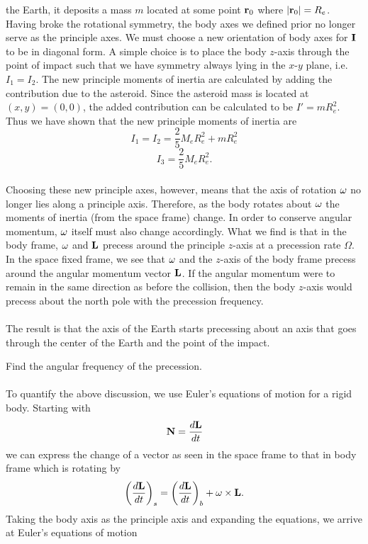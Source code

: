 \documentclass[11pt,letterpaper]{article}
\begin{document}
			the Earth, it deposits a mass $m$ located at some point $\mathbf{r}_0$ where $|\mathbf{r}_0| = R_e$. Having broke the rotational 
			symmetry, the body axes we defined prior no longer serve as the principle axes. We must choose a new orientation of body 
			axes for $\mathbf{I}$ to be in diagonal form. A simple choice is to place the body $z$-axis through the point of impact such that 
			we have symmetry always lying in the $x$-$y$ plane, i.e. $I_1 = I_2$. The new principle moments of inertia are calculated by 
			adding the contribution due to the asteroid. Since the asteroid mass is located at $(x,y) = (0,0)$, the added contribution can
			be calculated to be $I' = mR_e^2$. Thus we have shown that the new principle moments of inertia are
			\[
				I_1 = I_2 = \frac{2}{5}M_e R_e^2+mR_e^2
			\]
			\[
				I_3 = \frac{2}{5}M_eR_e^2.
			\]
			\\
			Choosing these new principle axes, however, means that the axis of rotation $\mathbf{\omega}$ no longer lies along a principle 
			axis. Therefore, as the body rotates about $\mathbf{\omega}$ the moments of inertia (from the space frame) change. In order to 
			conserve angular momentum, $\mathbf{\omega}$ itself must also change accordingly. What we find is that in the body frame, 
			$\mathbf{\omega}$ and $\mathbf{L}$ precess around the principle $z$-axis at a precession rate $\Omega$. In the space fixed frame, we 
			see that $\mathbf{\omega}$ and the $z$-axis of the body frame precess around the angular momentum vector $\mathbf{L}$. If the angular 
			momentum were to remain in the same direction as before the collision, then the body $z$-axis would precess about
			the north pole with the precession frequency. 
			\\ \\
			The result is that the axis of the Earth starts precessing about an axis that goes through the center of the Earth and the point 
			of the impact.\\
			\item
			Find the angular frequency of the precession.
			\\
			\\
			To quantify the above discussion, we use Euler's equations of motion for a rigid body. Starting with 
			\[
				\mathbf{N} = \frac{d\mathbf{L}}{dt} 
			\]
			we can express the change of a vector as seen in the space frame to that in body frame which is rotating by
			\[
				\left(\frac{d\mathbf{L}}{dt}\right)_s = \left(\frac{d\mathbf{L}}{dt}\right)_b +\mathbf{\omega} \times \mathbf{L}.
			\]
			Taking the body axis as the principle axis and expanding the equations, we arrive at Euler's equations of motion
\end{document}

